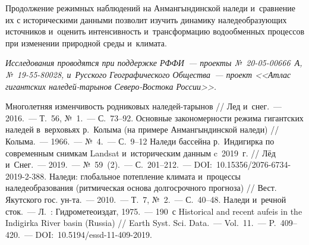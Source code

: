 Продолжение режимных наблюдений на Анмангындинской наледи и~сравнение их с историческими данными позволит изучить динамику наледеобразующих источников и~оценить интенсивность и~трансформацию водообменных процессов при изменении природной среды и~климата.

\textit{Исследования проводятся при поддержке РФФИ~--- проекты №~20-05-00666~А, №~19-55-80028, и~Русского Географического Общества~--- проект <<Атлас гигантских наледей-тарынов Северо-Востока России>>.}

\begin{thebibliography}{99}
\bibitem{} Многолетняя изменчивость родниковых наледей-тарынов // Лед и~снег.~--- 2016.~--- Т.~56, №~1.~--- С.~73--92.
\bibitem{} Основные закономерности режима гигантских наледей в~верховьях р.~Колыма (на примере Анмангындинской наледи) // Колыма.~--- 1966.~--- №~4.~--- С.~9--12
\bibitem{} Наледи бассейна р.~Индигирка по современным снимкам Landsat и~историческим данным c~2019~г. // Лёд и~Снег.~--- 2019.~--- №~59~(2).~--- С.~201--212.~--- DOI:~10.15356/2076-6734-2019-2-388.
\bibitem{} Наледи: глобальное потепление климата и~процессы наледеобразования (ритмическая основа долгосрочного прогноза) // Вест. Якутского гос. ун-та.~--- 2010.~--- Т.~7, №~2.~--- С.~40--48.
\bibitem{} Наледи и~речной сток.~--- Л.~: Гидрометеоиздат, 1975.~--- 190~с
\bibitem{} Historical and recent aufeis in the Indigirka River basin (Russia) // Earth Syst. Sci. Data.~--- Vol.~11.~--- P.~409--420.~--- DOI:~10.5194/essd-11-409-2019.
\end{thebibliography}
